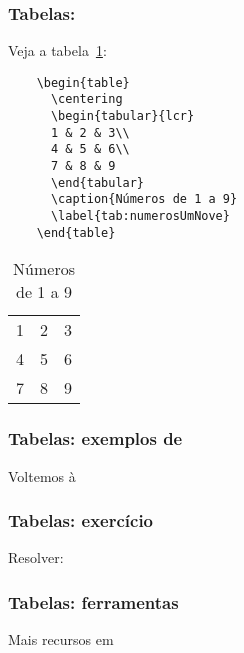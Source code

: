 \begin{frame}[fragile]
  \frametitle{Tabelas: }
  \large
  Veja a tabela~\ref{tab:numerosUmNove}:
  \vspace{1em}

  \begin{minipage}{.65\textwidth}
    \begin{verbatim}
    \begin{table}
      \centering
      \begin{tabular}{lcr}
      1 & 2 & 3\\
      4 & 5 & 6\\
      7 & 8 & 9
      \end{tabular}
      \caption{Números de 1 a 9}
      \label{tab:numerosUmNove}
    \end{table}
    \end{verbatim}
  \end{minipage}
  \hspace{.05\textwidth}
  \begin{minipage}{.25\textwidth}
    \begin{table}
      \centering
      \begin{tabular}{lcr}
        1 & 2 & 3\\
        4 & 5 & 6\\
        7 & 8 & 9
      \end{tabular}
      \caption{Números de 1 a 9}
      \label{tab:numerosUmNove}
    \end{table}
  \end{minipage}
\end{frame}

\begin{frame}
  \frametitle{Tabelas: exemplos de }
  \Huge
  Voltemos à 
\end{frame}

\begin{frame}
  \frametitle{Tabelas: exercício}
  \Huge
  Resolver: 
\end{frame}

\begin{frame}
  \frametitle{Tabelas: ferramentas}
  \Huge
  Mais recursos em 
\end{frame}
